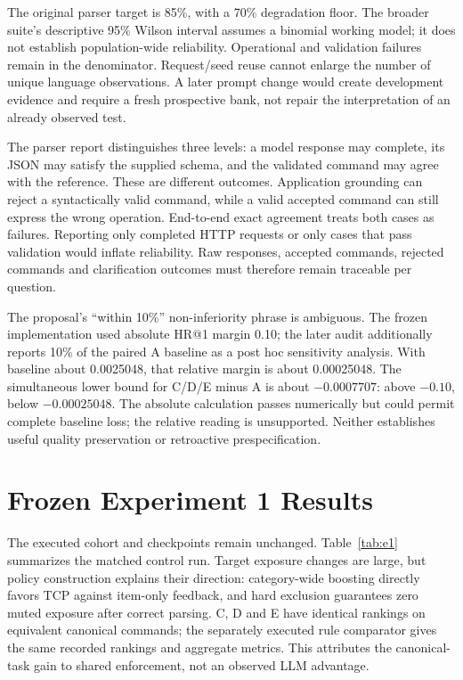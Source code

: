 \documentclass[conference]{IEEEtran}
\begin{document}
The original parser target is 85\%, with a 70\% degradation floor. The broader suite's descriptive 95\% Wilson interval assumes a binomial working model; it does not establish population-wide reliability. Operational and validation failures remain in the denominator. Request/seed reuse cannot enlarge the number of unique language observations. A later prompt change would create development evidence and require a fresh prospective bank, not repair the interpretation of an already observed test.

The parser report distinguishes three levels: a model response may complete, its JSON may satisfy the supplied schema, and the validated command may agree with the reference. These are different outcomes. Application grounding can reject a syntactically valid command, while a valid accepted command can still express the wrong operation. End-to-end exact agreement treats both cases as failures. Reporting only completed HTTP requests or only cases that pass validation would inflate reliability. Raw responses, accepted commands, rejected commands and clarification outcomes must therefore remain traceable per question.

The proposal's ``within 10\%'' non-inferiority phrase is ambiguous. The frozen implementation used absolute HR@1 margin 0.10; the later audit additionally reports 10\% of the paired A baseline as a post hoc sensitivity analysis. With baseline about 0.0025048, that relative margin is about 0.00025048. The simultaneous lower bound for C/D/E minus A is about $-0.0007707$: above $-0.10$, below $-0.00025048$. The absolute calculation passes numerically but could permit complete baseline loss; the relative reading is unsupported. Neither establishes useful quality preservation or retroactive prespecification.

\section{Frozen Experiment 1 Results}
The executed cohort and checkpoints remain unchanged. Table~\ref{tab:e1} summarizes the matched control run. Target exposure changes are large, but policy construction explains their direction: category-wide boosting directly favors TCP against item-only feedback, and hard exclusion guarantees zero muted exposure after correct parsing. C, D and E have identical rankings on equivalent canonical commands; the separately executed rule comparator gives the same recorded rankings and aggregate metrics. This attributes the canonical-task gain to shared enforcement, not an observed LLM advantage.
\end{document}
